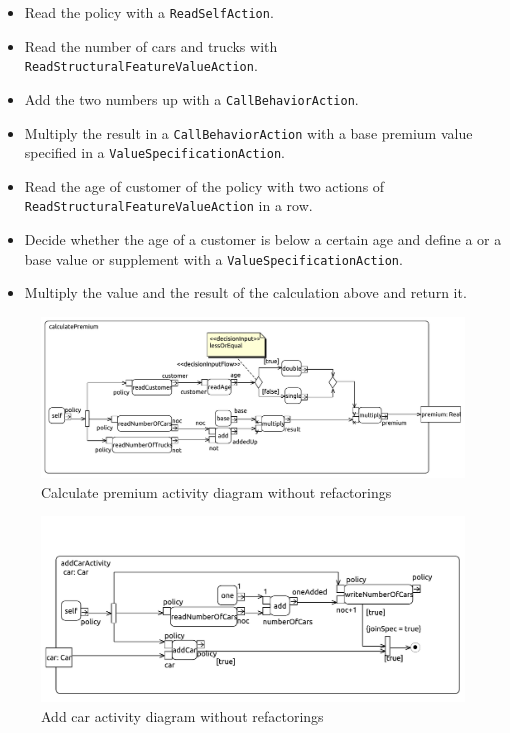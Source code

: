 \documentclass{llncs}
\begin{document}
\begin{itemize}
 \item Read the policy with a \lstinline|ReadSelfAction|.
 \item Read the number of cars and trucks with \lstinline|ReadStructuralFeatureValueAction|.
 \item Add the two numbers up with a \lstinline|CallBehaviorAction|.
 \item Multiply the result in a \lstinline|CallBehaviorAction| with a base premium value specified in a \lstinline|ValueSpecificationAction|.
 \item Read the age of customer of the policy with two actions of \lstinline|ReadStructuralFeatureValueAction| in a row.
 \item Decide whether the age of a customer is below a certain age and define a or a base value or supplement with a \lstinline|ValueSpecificationAction|.
 \item Multiply the value and the result of the calculation above and return it.
\end{itemize}

\begin{figure}[h!t]
 \centering
 \includegraphics[scale=0.5]{images/insurance/Activity_calculatePremium_calculatePremium}
 \caption{Calculate premium activity diagram without refactorings}
 \label{fig:calculatePremium}
\end{figure}

\begin{figure}[ht]
 \centering
 \includegraphics[scale=0.6]{images/insurance/Activity_addCarActivity_addCarActivity}
 \caption{Add car activity diagram without refactorings}
 \label{fig:addCar}
\end{figure}
\end{document}
